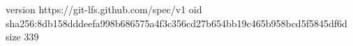 version https://git-lfs.github.com/spec/v1
oid sha256:8db158dddeefa998b686575a4f3c356cd27b654bb19c465b958bcd5f5845df6d
size 339
